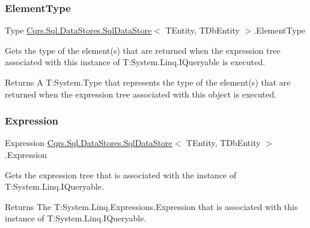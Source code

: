 \subsubsection{\texorpdfstring{Element\+Type}{ElementType}}
{\footnotesize\ttfamily Type \hyperlink{classCqrs_1_1Sql_1_1DataStores_1_1SqlDataStore}{Cqrs.\+Sql.\+Data\+Stores.\+Sql\+Data\+Store}$<$ T\+Entity, T\+Db\+Entity $>$.Element\+Type\hspace{0.3cm}{\ttfamily [get]}}



Gets the type of the element(s) that are returned when the expression tree associated with this instance of T\+:\+System.\+Linq.\+I\+Queryable is executed. 

\begin{DoxyReturn}{Returns}
A T\+:\+System.\+Type that represents the type of the element(s) that are returned when the expression tree associated with this object is executed. 
\end{DoxyReturn}
\mbox{\label{classCqrs_1_1Sql_1_1DataStores_1_1SqlDataStore_a821c821912482862e0b6143a3125e2e1}} 
\subsubsection{\texorpdfstring{Expression}{Expression}}
{\footnotesize\ttfamily Expression \hyperlink{classCqrs_1_1Sql_1_1DataStores_1_1SqlDataStore}{Cqrs.\+Sql.\+Data\+Stores.\+Sql\+Data\+Store}$<$ T\+Entity, T\+Db\+Entity $>$.Expression\hspace{0.3cm}{\ttfamily [get]}}



Gets the expression tree that is associated with the instance of T\+:\+System.\+Linq.\+I\+Queryable. 

\begin{DoxyReturn}{Returns}
The T\+:\+System.\+Linq.\+Expressions.\+Expression that is associated with this instance of T\+:\+System.\+Linq.\+I\+Queryable. 
\end{DoxyReturn}
\mbox{\label{classCqrs_1_1Sql_1_1DataStores_1_1SqlDataStore_af732efd5901590c769e2ace2a4f4f913}} 
